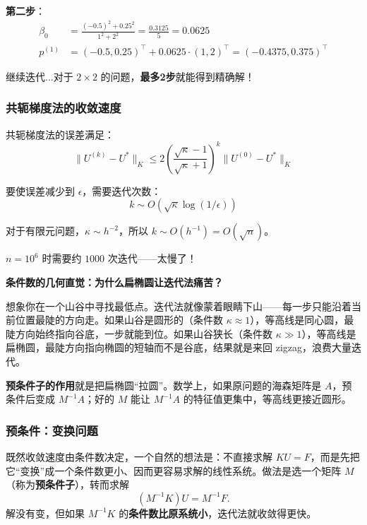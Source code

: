 \textbf{第二步}：
\begin{align*}
\beta_0 &= \frac{(-0.5)^2 + 0.25^2}{1^2 + 2^2} = \frac{0.3125}{5} = 0.0625 \\
p^{(1)} &= (-0.5, 0.25)^\top + 0.0625 \cdot (1, 2)^\top = (-0.4375, 0.375)^\top
\end{align*}

继续迭代...对于 $2 \times 2$ 的问题，\textbf{最多2步}就能得到精确解！

\subsubsection*{共轭梯度法的收敛速度}

\begin{keytheorem}[title=CG 收敛速度]
共轭梯度法的误差满足：
\begin{equation}
\|U^{(k)} - U^*\|_K \leq 2 \left(\frac{\sqrt{\kappa} - 1}{\sqrt{\kappa} + 1}\right)^k \|U^{(0)} - U^*\|_K
\end{equation}

要使误差减少到 $\epsilon$，需要迭代次数：
\begin{equation}
k \sim O\left(\sqrt{\kappa} \log(1/\epsilon)\right)
\end{equation}
\end{keytheorem}

对于有限元问题，$\kappa \sim h^{-2}$，所以 $k \sim O(h^{-1}) = O(\sqrt{n})$。

$n = 10^6$ 时需要约 $1000$ 次迭代——太慢了！

\begin{insightbox}
\textbf{条件数的几何直觉：为什么扁椭圆让迭代法痛苦？}

想象你在一个山谷中寻找最低点。迭代法就像蒙着眼睛下山——每一步只能沿着当前位置最陡的方向走。如果山谷是圆形的（条件数 $\kappa \approx 1$），等高线是同心圆，最陡方向始终指向谷底，一步就能到位。如果山谷狭长（条件数 $\kappa \gg 1$），等高线是扁椭圆，最陡方向指向椭圆的短轴而不是谷底，结果就是来回 zigzag，浪费大量迭代。

\textbf{预条件子的作用}就是把扁椭圆“拉圆”。数学上，如果原问题的海森矩阵是 $A$，预条件后变成 $M^{-1}A$；好的 $M$ 能让 $M^{-1}A$ 的特征值更集中，等高线更接近圆形。
\end{insightbox}

\subsubsection*{预条件：变换问题}

既然收敛速度由条件数决定，一个自然的想法是：不直接求解 $KU = F$，而是先把它“变换”成一个条件数更小、因而更容易求解的线性系统。做法是选一个矩阵 $M$（称为\textbf{预条件子}），转而求解
\[
(M^{-1}K)U = M^{-1}F .
\]
解没有变，但如果 $M^{-1}K$ 的\textbf{条件数比原系统小}，迭代法就收敛得更快。

